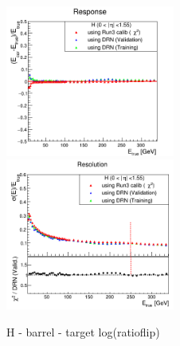 \begin{figure}
\includegraphics[width=0.495\textwidth]{./plots_pdf/HCAL_plots/Trained_target_ratioflip_0_500_10/pdf/H_barrel/barrel_corrEtaBarrelHcal.png}
\includegraphics[width=0.495\textwidth]{./plots_pdf/HCAL_plots/Trained_target_ratioflip_0_500_10/pdf/H_barrel/barrel_corrEtaBarrelHcal_reso.png}
\caption{H - barrel - target log(ratioflip)}                                                                                                                                               
\end{figure}


